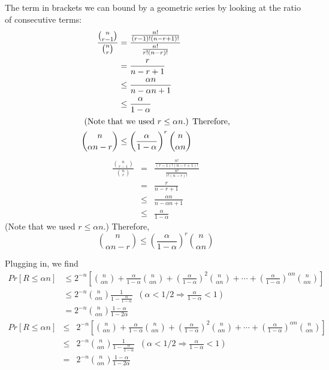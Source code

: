 \documentclass[11pt,twoside]{article}
\begin{document}
The term in brackets we can bound by a geometric series by looking
at the ratio of consecutive terms:
\begin{align*}
\frac{\binom{n}{r-1}}{\binom{n}{r}} &=
\frac{\frac{n!}{(r-1)!(n-r+1)!}}{\frac{n!}{r!(n-r)!}}\\
&= \frac{r}{n-r+1}\\
&\leq \frac{\alpha n}{n- \alpha n + 1}\\
&\leq \frac{\alpha}{1 -\alpha} \\
\intertext{
(Note that we used $r \leq \alpha n$.)
Therefore,}
\binom{n}{\alpha n - r} &\le
\left(\frac{\alpha}{1 -\alpha}\right)^r\binom{n}{\alpha n}
\end{align*}
\begin{eqnarray*}
\frac{\binom{n}{r-1}}{\binom{n}{r}} &=&
\frac{\frac{n!}{(r-1)!(n-r+1)!}}{\frac{n!}{r!(n-r)!}}\\
&=& \frac{r}{n-r+1}\\
&\leq& \frac{\alpha n}{n- \alpha n + 1}\\
&\leq& \frac{\alpha}{1 -\alpha}
\end{eqnarray*}
(Note that we used $r \leq \alpha n$.)
Therefore,
\[
\binom{n}{\alpha n - r} \le
\left(\frac{\alpha}{1 -\alpha}\right)^r\binom{n}{\alpha n}
\]

Plugging in, we find
\begin{align*}
Pr[R\leq \alpha n]
 &\leq 2^{-n}\left[ \binom{n}{\alpha n} +
 \frac{\alpha}{1 -\alpha}\binom{n}{\alpha n} +
 \left(\frac{\alpha}{1 -\alpha}\right)^2\binom{n}{\alpha n}+ \cdots
   + \left(\frac{\alpha}{1 -\alpha}\right)^{\alpha n}\binom{n}{\alpha
     n} \right] \\
   &\leq 2^{-n}\binom{n}{\alpha n}\frac{1}{1 -\frac{\alpha}{1 -\alpha}}
   \;\; (\alpha < 1/2 \Rightarrow \frac{\alpha}{1 -\alpha}<1) \\
   &= 2^{-n}\binom{n}{\alpha n}\frac{1 -\alpha}{1 -2\alpha}
\end{align*}
\begin{eqnarray*}
Pr[R\leq \alpha n]
  &\leq& 2^{-n}\left[ \binom{n}{\alpha n} +
  \frac{\alpha}{1 -\alpha}\binom{n}{\alpha n} +
  \left(\frac{\alpha}{1 -\alpha}\right)^2\binom{n}{\alpha n}+ \cdots
    + \left(\frac{\alpha}{1 -\alpha}\right)^{\alpha n}\binom{n}{\alpha
      n} \right] \\
    &\leq& 2^{-n}\binom{n}{\alpha n}\frac{1}{1 -\frac{\alpha}{1 -\alpha}}
    \;\; (\alpha < 1/2 \Rightarrow \frac{\alpha}{1 -\alpha}<1) \\
    &=& 2^{-n}\binom{n}{\alpha n}\frac{1 -\alpha}{1 -2\alpha}
\end{eqnarray*}
\end{document}
